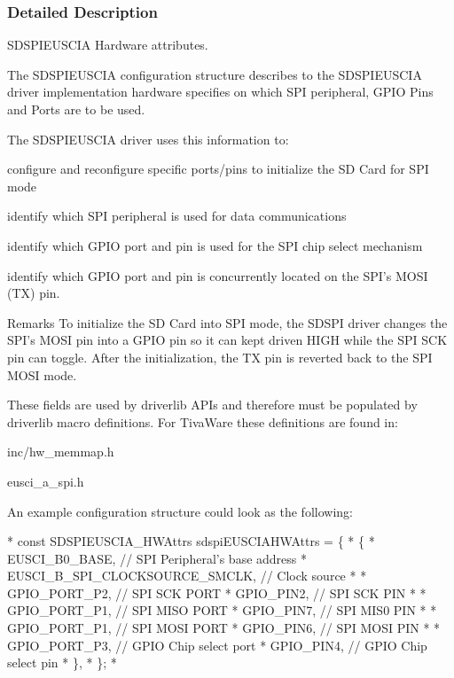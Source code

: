 \subsubsection{Detailed Description}
S\-D\-S\-P\-I\-E\-U\-S\-C\-I\-A Hardware attributes. 

The S\-D\-S\-P\-I\-E\-U\-S\-C\-I\-A configuration structure describes to the S\-D\-S\-P\-I\-E\-U\-S\-C\-I\-A driver implementation hardware specifies on which S\-P\-I peripheral, G\-P\-I\-O Pins and Ports are to be used.

The S\-D\-S\-P\-I\-E\-U\-S\-C\-I\-A driver uses this information to\-:
\begin{DoxyItemize}
\item configure and reconfigure specific ports/pins to initialize the S\-D Card for S\-P\-I mode
\item identify which S\-P\-I peripheral is used for data communications
\item identify which G\-P\-I\-O port and pin is used for the S\-P\-I chip select mechanism
\item identify which G\-P\-I\-O port and pin is concurrently located on the S\-P\-I's M\-O\-S\-I (T\-X) pin.
\end{DoxyItemize}

\begin{DoxyRemark}{Remarks}
To initialize the S\-D Card into S\-P\-I mode, the S\-D\-S\-P\-I driver changes the S\-P\-I's M\-O\-S\-I pin into a G\-P\-I\-O pin so it can kept driven H\-I\-G\-H while the S\-P\-I S\-C\-K pin can toggle. After the initialization, the T\-X pin is reverted back to the S\-P\-I M\-O\-S\-I mode.
\end{DoxyRemark}
These fields are used by driverlib A\-P\-Is and therefore must be populated by driverlib macro definitions. For Tiva\-Ware these definitions are found in\-:
\begin{DoxyItemize}
\item inc/hw\-\_\-memmap.\-h
\item eusci\-\_\-a\-\_\-spi.\-h
\end{DoxyItemize}

An example configuration structure could look as the following\-: 
\begin{DoxyCode}
*  \textcolor{keyword}{const} SDSPIEUSCIA_HWAttrs sdspiEUSCIAHWAttrs = \{
*      \{
*           EUSCI\_B0\_BASE, \textcolor{comment}{// SPI Peripheral's base address}
*           EUSCI\_B\_SPI\_CLOCKSOURCE\_SMCLK, \textcolor{comment}{// Clock source}
*
*           GPIO\_PORT\_P2,  \textcolor{comment}{// SPI SCK PORT}
*           GPIO\_PIN2,     \textcolor{comment}{// SPI SCK PIN}
*
*           GPIO\_PORT\_P1,  \textcolor{comment}{// SPI MISO PORT}
*           GPIO\_PIN7,     \textcolor{comment}{// SPI MIS0 PIN}
*
*           GPIO\_PORT\_P1,  \textcolor{comment}{// SPI MOSI PORT}
*           GPIO\_PIN6,     \textcolor{comment}{// SPI MOSI PIN}
*
*           GPIO\_PORT\_P3,  \textcolor{comment}{// GPIO Chip select port}
*           GPIO\_PIN4,     \textcolor{comment}{// GPIO Chip select pin}
*       \},
*  \};
*  
\end{DoxyCode}
 

